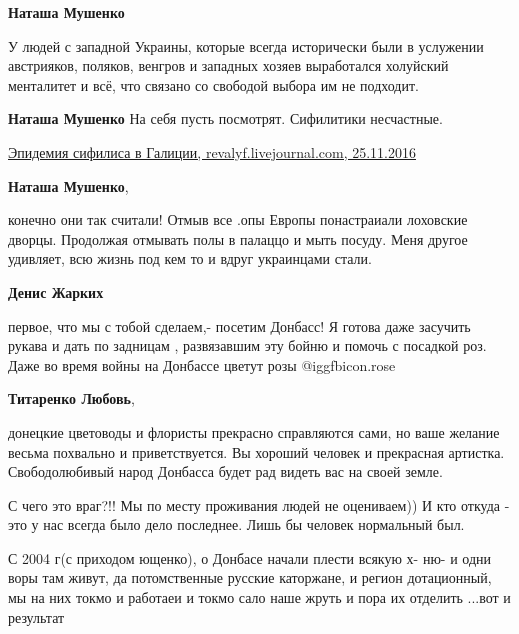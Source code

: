 \begin{itemize}
\begin{itemize} %
\textbf{Наташа Мушенко} 

У людей с западной Украины, которые всегда исторически были в услужении
австрияков, поляков, венгров и западных хозяев выработался холуйский менталитет
и всё, что связано со свободой выбора им не подходит.


\textbf{Наташа Мушенко} На себя пусть посмотрят. Сифилитики несчастные. 

\href{https://revalyf.livejournal.com/53168.html}{%
Эпидемия сифилиса в Галиции, revalyf.livejournal.com, 25.11.2016%
}

\textbf{Наташа Мушенко},

конечно они так считали! Отмыв все .опы Европы понастраиали лоховские дворцы.
Продолжая отмывать полы в палаццо и мыть посуду. Меня другое удивляет, всю
жизнь под кем то и вдруг украинцами стали.

\end{itemize} %

\textbf{Денис Жарких} 

первое, что мы с тобой сделаем,- посетим Донбасс! Я готова даже засучить рукава
и дать по задницам , развязавшим эту бойню и помочь с посадкой роз. Даже во
время войны на Донбассе цветут розы  @igg{fbicon.rose} 

\begin{itemize} %
\textbf{Титаренко Любовь}, 

донецкие цветоводы и флористы прекрасно справляются сами, но ваше желание
весьма похвально и приветствуется. Вы хороший человек и прекрасная артистка.
Свободолюбивый народ Донбасса будет рад видеть вас на своей земле.

\end{itemize} %


С чего это враг?!! Мы по месту проживания людей не оцениваем)) И кто откуда -
это у нас всегда было дело последнее. Лишь бы человек нормальный был.


С 2004 г(с приходом ющенко), о Донбасе начали плести всякую х- ню- и одни воры
там живут, да потомственные русские каторжане, и регион дотационный, мы на них
токмо и работаеи и токмо сало наше жруть и пора их отделить ...вот и результат

\end{itemize} %
